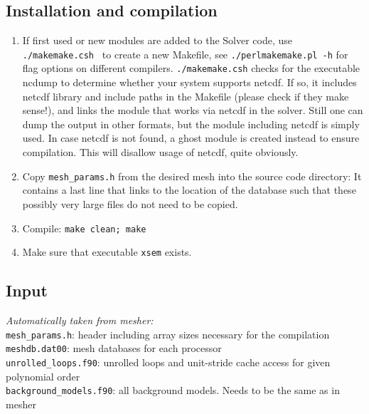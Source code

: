 \documentclass[11pt,letter,fleqn,english,notitlepage]{article}
\begin{document}
\subsection{Installation and compilation}
\begin{enumerate}
\item If first used or new modules are added to the Solver code,
use {\tt ./makemake.csh } to create a new Makefile, see {\tt ./perlmakemake.pl -h} for 
flag options on different compilers. {\tt ./makemake.csh} checks for the
executable ncdump to determine whether your system supports netcdf. If
so, it includes netcdf library and include paths in the Makefile
(please check if they make sense!), and links the module that works
via netcdf in the solver. Still one can dump the output in other
formats, but the module including netcdf is simply used. In case
netcdf is not found, a ghost module is created instead to ensure
compilation. This will disallow usage of netcdf, quite obviously.
\item Copy {\tt mesh\_params.h} from the desired mesh into the source code directory: 
It contains a last line that links to the location of the database such that 
these possibly very large files do not need to be copied. 
\item Compile: {\tt make clean; make}
\item Make sure that executable {\tt xsem} exists.
\end{enumerate}


\subsection{Input}

\textit{Automatically taken from mesher:} \\
{\tt mesh\_params.h}: header including array sizes necessary for the compilation\\
{\tt meshdb.dat00\*}: mesh databases for each processor\\
{\tt unrolled\_loops.f90}: unrolled loops and unit-stride cache access for given polynomial order\\
{\tt background\_models.f90}: all background models. Needs to be the same as in mesher\\
\end{document}
